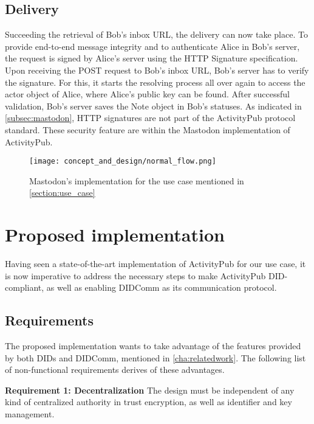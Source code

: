 \subsection{Delivery}
Succeeding the retrieval of Bob's inbox URL, the delivery can now take place. To provide end-to-end message integrity and to authenticate Alice in Bob's server, the request is signed by Alice's server using the HTTP Signature specification. Upon receiving the POST request to Bob's inbox URL, Bob's server has to verify the signature. For this, it starts the resolving process all over again to access the actor object of Alice, where Alice's public key can be found. After successful validation, Bob's server saves the Note object in Bob's statuses.
As indicated in \autoref{subsec:mastodon}, HTTP signatures are not part of the ActivityPub protocol standard. These security feature are within the Mastodon implementation of ActivityPub.

\begin{figure}[H]
  \centering
  \texttt{[image: concept\_and\_design/normal\_flow.png]}
  \caption{Mastodon's implementation for the use case mentioned in \ref{section:use_case}}
  \label{fig:normal_flow}
\end{figure}

\pagebreak

\section{Proposed implementation}\label{section:did_flow}
Having seen a state-of-the-art implementation of ActivityPub for our use case, it is now imperative to address the necessary steps to make ActivityPub DID-compliant, as well as enabling DIDComm as its communication protocol. 

\subsection{Requirements}
The proposed implementation wants to take advantage of the features provided by both DIDs and DIDComm, mentioned in \autoref{cha:relatedwork}. The following list of non-functional requirements derives of these advantages. 

\textbf{Requirement 1: Decentralization}
The design must be independent of any kind of centralized authority in trust encryption, as well as identifier and key management.

